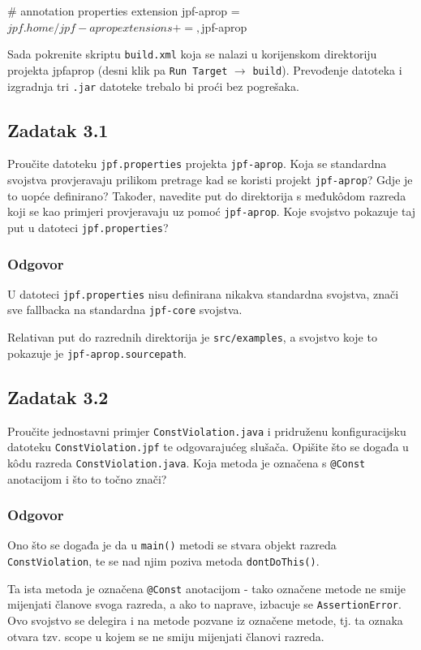 \documentclass{article}
\newcommand{\zadatak}[1]{\subsection{Zadatak #1}}
\newcommand{\odgovor}{\subsubsection*{Odgovor}}
\newcommand{\code}[1]{\colorbox{blue!11}{\texttt{#1}}}
\begin{document}
\begin{ccode}
# annotation properties extension
jpf-aprop = ${jpf.home}/jpf-aprop
extensions+=,${jpf-aprop}
\end{ccode}

\noindent
Sada pokrenite skriptu \texttt{build.xml} koja se nalazi u korijenskom direktoriju projekta jpfaprop (desni klik pa \texttt{Run Target} $\rightarrow$ \texttt{build}). Prevođenje datoteka i izgradnja tri \texttt{.jar} datoteke trebalo bi proći bez pogrešaka.



\zadatak{3.1}

Proučite datoteku \texttt{jpf.properties} projekta \texttt{jpf-aprop}. Koja se standardna svojstva provjeravaju prilikom pretrage kad se koristi projekt \texttt{jpf-aprop}? Gdje je to uopće definirano? Također, navedite put do direktorija s međukôdom razreda koji se kao primjeri provjeravaju uz pomoć \texttt{jpf-aprop}. Koje svojstvo pokazuje taj put u datoteci \texttt{jpf.properties}?

\odgovor

U datoteci \texttt{jpf.properties} nisu definirana nikakva standardna svojstva, znači sve fallbacka na standardna \texttt{jpf-core} svojstva.\newline

\noindent
Relativan put do razrednih direktorija je \texttt{src/examples}, a svojstvo koje to pokazuje je \texttt{jpf-aprop.sourcepath}.

\pagebreak  %

\zadatak{3.2}

Proučite jednostavni primjer \texttt{ConstViolation.java} i pridruženu konfiguracijsku datoteku \texttt{ConstViolation.jpf} te odgovarajućeg slušača. Opišite što se događa u kôdu razreda \texttt{ConstViolation.java}. Koja metoda je označena s \code{@Const} anotacijom i što to točno znači?

\odgovor

Ono što se događa je da u \code{main()} metodi se stvara objekt razreda \texttt{ConstViolation}, te se nad njim poziva metoda \code{dontDoThis()}.\newline

\noindent
Ta ista metoda je označena \code{@Const} anotacijom - tako označene metode ne smije mijenjati članove svoga razreda, a ako to naprave, izbacuje se \texttt{AssertionError}. Ovo svojstvo se delegira i na metode pozvane iz označene metode, tj. ta oznaka otvara tzv. scope u kojem se ne smiju mijenjati članovi razreda.
\end{document}
